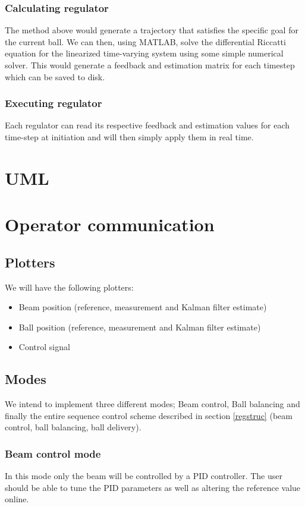 \documentclass{article}
\begin{document}
\subsubsection{Calculating regulator}
The method above would generate a trajectory that satisfies the specific goal for the current ball. We can then, using MATLAB, solve the differential Riccatti equation for the linearized time-varying system using some simple numerical solver. This would generate a feedback and estimation matrix for each timestep which can be saved to disk.
\subsubsection{Executing regulator}
Each regulator can read its respective feedback and estimation values for each time-step at initiation and will then simply apply them in real time.

\section{UML}


\section{Operator communication}
\subsection{Plotters}
We will have the following plotters:
\begin{itemize}
\item Beam position (reference, measurement and Kalman filter estimate)
\item Ball position (reference, measurement and Kalman filter estimate)
\item Control signal
\end{itemize}

\subsection{Modes}
We intend to implement three different modes; Beam control, Ball balancing and finally the entire sequence control scheme described in section \ref{regstruc} (beam control, ball balancing, ball delivery).
\subsubsection{Beam control mode}
In this mode only the beam will be controlled by a PID controller. The user should be able to tune the PID parameters as well as altering the reference value online.
\end{document}
